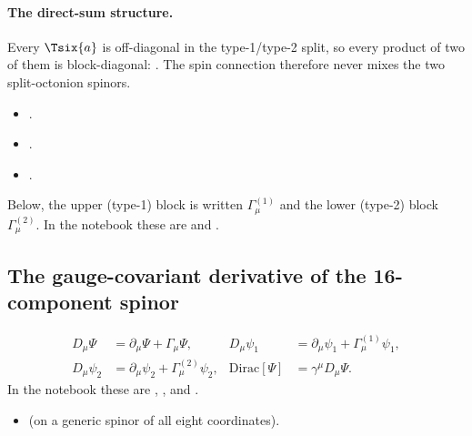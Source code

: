 \paragraph{The direct-sum structure.} Every $\Tsix{a}$ is off-diagonal in the type-1/type-2 split,
so every product of two of them is block-diagonal:
. The spin
connection therefore never mixes the two split-octonion spinors.
\begin{itemize}
  \item {} .
  \item {} .
  \item {} .
\end{itemize}
Below, the upper (type-1) block is written $\Gamma^{(1)}_\mu$ and the lower (type-2) block
$\Gamma^{(2)}_\mu$. In the notebook these are  and .

\subsection{The gauge-covariant derivative of the 16-component spinor}
\label{csc:dirac}\label{sec:6.8}

\begin{equation}
\begin{aligned}
  D_\mu\Psi&=\partial_\mu\Psi+\Gamma_\mu\Psi, &
  D_\mu\psi_1&=\partial_\mu\psi_1+\Gamma^{(1)}_\mu\psi_1,\\
  D_\mu\psi_2&=\partial_\mu\psi_2+\Gamma^{(2)}_\mu\psi_2, &
  \mathrm{Dirac}[\Psi]&=\gamma^\mu D_\mu\Psi .
\end{aligned}
\end{equation}
In the notebook these are ,
,  and
.
\begin{itemize}
  \item {} 
    (on a generic spinor of all eight coordinates).
\end{itemize}

